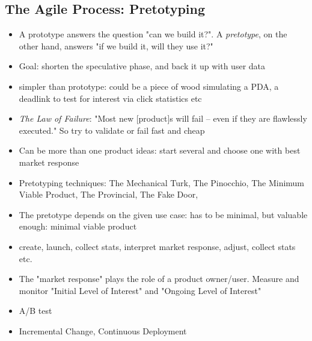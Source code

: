 \documentclass[a4paper,10pt]{article}
\begin{document}
\subsection{The Agile Process: Pretotyping}
\begin{itemize}
\item A prototype answers the question "can we build it?". A \emph{pretotype}, on the other hand, answers "if we build it, will they use it?"
\item Goal: shorten the speculative phase, and back it up with user data
\item simpler than prototype: could be a piece of wood simulating a PDA, a deadlink to test for interest via click statistics etc
\item \emph{The Law of Failure}: "Most new [product]s will fail – even if they are flawlessly executed." So try to validate or fail fast and cheap
\item Can be more than one product ideas: start several and choose one with best market response
\item Pretotyping techniques: The Mechanical Turk, The Pinocchio, The Minimum Viable Product, The Provincial, The Fake Door, 
\item The pretotype depends on the given use case: has to be minimal, but valuable enough: minimal viable product
\item create, launch, collect stats, interpret market response, adjust, collect stats etc.
\item The "market response" plays the role of a product owner/user. Measure and monitor "Initial Level of Interest" and "Ongoing Level of Interest"
\item A/B test
\item Incremental Change, Continuous Deployment
\end{itemize}
\end{document}

